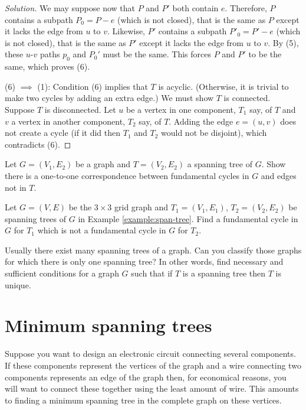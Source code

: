 \begin{proof}[Solution]
We may suppose now that $P$ and $P'$ both contain $e$.
Therefore, $P$ contains a subpath $P_0=P-e$ (which is not
closed), that is the same as $P$ except it lacks the edge
from $u$ to $v$. Likewise, $P'$ contains a subpath $P'_0=P'-e$ (which is not
closed), that is the same as $P'$ except it lacks the edge
from $u$ to $v$. By (5), these $u$-$v$ paths
$p_0$ and $P_0'$ must be the same. This forces
$P$ and $P'$ to be the same, which proves (6).


\noindent
(6) $\implies$ (1):
Condition (6) implies that $T$ is acyclic. (Otherwise, it is trivial
to make two cycles by adding an extra edge.) We must show $T$ is connected.
Suppose $T$ is disconnected. Let $u$ be a vertex in one component,
$T_1$ say,
of $T$ and $v$ a vertex in another component, $T_2$ say, of $T$.
Adding the edge $e=(u,v)$ does not create a cycle (if it did
then $T_1$ and $T_2$ would not be disjoint), which contradicts (6).
\end{proof}

\begin{exercise}
Let $G=(V_1,E_2)$ be a graph and $T=(V_2,E_2)$ a spanning tree of $G$.
Show there is a one-to-one correspondence between fundamental cycles in $G$ and
edges not in $T$.
\end{exercise}

\begin{exercise}
Let $G=(V, E)$ be the $3\times 3$ grid graph and $T_1=(V_1,E_1)$,
$T_2=(V_2,E_2)$ be spanning trees of $G$ in Example \ref{example:span-tree}.
Find a fundamental cycle in $G$ for $T_1$ which is not a
fundamental cycle in $G$ for $T_2$.
\end{exercise}

\begin{exercise}
Usually there exist many spanning trees of a graph.
Can you classify those graphs for which there is only one spanning tree?
In other words, find necessary and sufficient conditions for a
graph $G$ such that if $T$ is a spanning tree then $T$ is unique.
\end{exercise}



\section{Minimum spanning trees}

Suppose you want to design an electronic circuit
connecting several components. If these components represent the
vertices of the graph and a wire connecting two components
represents an edge of the graph then, for economical reasons, you will want to
connect these together using the least amount of wire.
This amounts to finding a minimum spanning tree in the
complete graph on these vertices.

